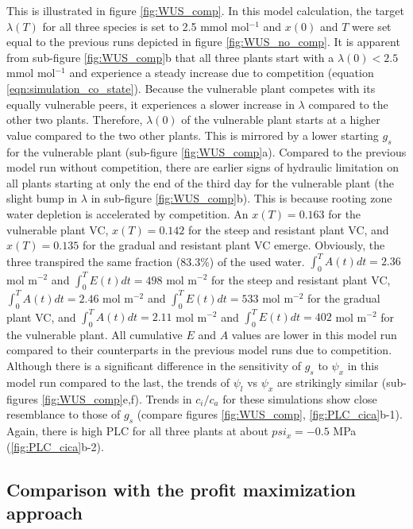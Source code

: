 \documentclass[utf8]{frontiersSCNS} %
\begin{document}
This is illustrated in figure \ref{fig:WUS_comp}. In this model calculation, the target $\lambda(T)$ for all three species is set to 2.5 mmol mol$^{-1}$ and $x(0)$ and $T$ were set equal to the previous runs depicted in figure \ref{fig:WUS_no_comp}. It is apparent from sub-figure \ref{fig:WUS_comp}b that all three plants start with a $\lambda(0) < 2.5$ mmol mol$^{-1}$ and experience a steady increase due to competition (equation \ref{eqn:simulation_co_state}). Because the vulnerable plant competes with its equally vulnerable peers, it experiences a slower increase in $\lambda$ compared to the other two plants. Therefore, $\lambda(0)$ of the vulnerable plant starts at a higher value compared to the two other plants. This is mirrored by a lower starting $g_s$ for the vulnerable plant (sub-figure \ref{fig:WUS_comp}a). Compared to the previous model run without competition, there are earlier signs of hydraulic limitation on all plants starting at only the end of the third day for the vulnerable plant (the slight bump in $\lambda$ in sub-figure \ref{fig:WUS_comp}b). This is because rooting zone water depletion is accelerated by competition. An $x(T)=0.163$ for the vulnerable plant VC, $x(T)=0.142$ for the steep and resistant plant VC, and $x(T)=0.135$ for the gradual and resistant plant VC emerge. Obviously, the three transpired the same fraction (83.3\%) of the used water. $\int_0^TA(t)dt= 2.36$ mol m$^{-2}$ and $\int_0^TE(t)dt= 498$ mol m$^{-2}$ for the steep and resistant plant VC, $\int_0^TA(t)dt= 2.46$ mol m$^{-2}$ and $\int_0^TE(t)dt= 533$ mol m$^{-2}$ for the gradual plant VC, and $\int_0^TA(t)dt= 2.11$ mol m$^{-2}$ and $\int_0^TE(t)dt= 402$ mol m$^{-2}$ for the vulnerable plant. All cumulative $E$ and $A$ values are lower in this model run compared to their counterparts in the previous model runs due to competition. Although there is a significant difference in the sensitivity of $g_s$ to $\psi_x$ in this model run compared to the last, the trends of $\psi_l$ vs $\psi_x$ are strikingly similar (sub-figures \ref{fig:WUS_comp}e,f). Trends in $c_i / c_a$ for these simulations show close resemblance to those of $g_s$ (compare figures \ref{fig:WUS_comp}, \ref{fig:PLC_cica}b-1). Again, there is high PLC for all three plants at about $psi_x = -0.5$ MPa (\ref{fig:PLC_cica}b-2).

\subsection{Comparison with the profit maximization approach}
\end{document}
